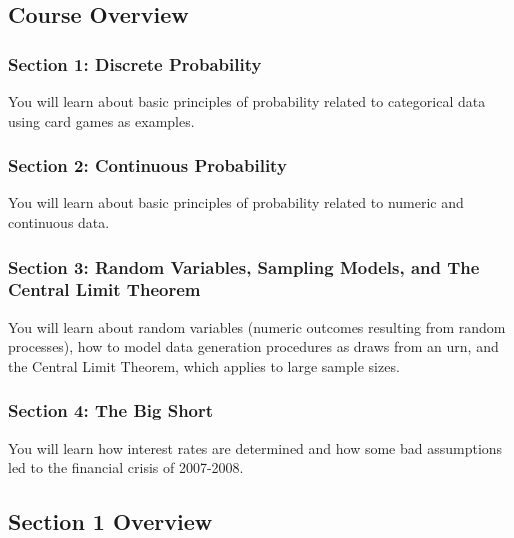 \documentclass[
]{article}
\begin{document}
\hypertarget{course-overview}{%
\subsection{Course Overview}\label{course-overview}}

\hypertarget{section-1-discrete-probability}{%
\subsubsection{Section 1: Discrete
Probability}\label{section-1-discrete-probability}}

You will learn about basic principles of probability related to
categorical data using card games as examples.

\hypertarget{section-2-continuous-probability}{%
\subsubsection{Section 2: Continuous
Probability}\label{section-2-continuous-probability}}

You will learn about basic principles of probability related to numeric
and continuous data.

\hypertarget{section-3-random-variables-sampling-models-and-the-central-limit-theorem}{%
\subsubsection{Section 3: Random Variables, Sampling Models, and The
Central Limit
Theorem}\label{section-3-random-variables-sampling-models-and-the-central-limit-theorem}}

You will learn about random variables (numeric outcomes resulting from
random processes), how to model data generation procedures as draws from
an urn, and the Central Limit Theorem, which applies to large sample
sizes.

\hypertarget{section-4-the-big-short}{%
\subsubsection{Section 4: The Big Short}\label{section-4-the-big-short}}

You will learn how interest rates are determined and how some bad
assumptions led to the financial crisis of 2007-2008.

\hypertarget{section-1-overview}{%
\subsection{Section 1 Overview}\label{section-1-overview}}
\end{document}
